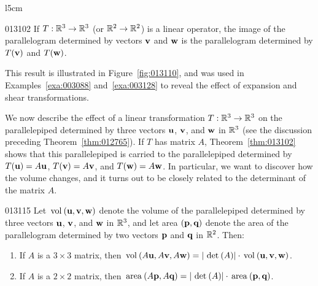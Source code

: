 \begin{wrapfigure}[11]{l}{5cm} 
\vspace*{-2em}
\centering

\caption{\label{fig:013110}}
\end{wrapfigure}

\hspace{0em}\hfill\begin{theorem}{}{013102}
If $T : \mathbb{R}^3 \to \mathbb{R}^3$ (or $\mathbb{R}^2 \to \mathbb{R}^2$) is a linear operator, the image of the parallelogram determined by vectors $\textbf{v}$ and $\textbf{w}$ is the parallelogram determined by $T(\textbf{v})$ and $T(\textbf{w})$.
\end{theorem}

\noindent This result is illustrated in Figure~\ref{fig:013110}, and was used in Examples~\ref{exa:003088} and~\ref{exa:003128} to reveal the effect of expansion and shear transformations.

We now describe the effect of a linear transformation $T: \mathbb{R}^3 \to \mathbb{R}^3$ on the parallelepiped determined by three vectors $\textbf{u}$, $\textbf{v}$, and $\textbf{w}$ in $\mathbb{R}^3$ (see the discussion preceding Theorem~\ref{thm:012765}). If $T$ has matrix $A$, Theorem~\ref{thm:013102} shows that this parallelepiped is carried to the parallelepiped determined by $T(\textbf{u}) = A\textbf{u}$, $T(\textbf{v}) = A\textbf{v}$, and $T(\textbf{w}) = A\textbf{w}$. In particular, we want to discover how the volume changes, and it turns out to be closely related to the determinant of the matrix $A$.

\begin{theorem}{}{013115}
Let $\thinspace\operatorname{vol\medspace}(\textbf{u}, \textbf{v}, \textbf{w})$ denote the volume of the parallelepiped determined by three vectors $\textbf{u}$, $\textbf{v}$, and $\textbf{w}$ in $\mathbb{R}^3$, and let area $(\textbf{p}, \textbf{q})$ denote the area of the parallelogram determined by two vectors $\textbf{p}$ and $\textbf{q}$ in $\mathbb{R}^2$. Then:

\begin{enumerate}
\item If $A$ is a $3 \times 3$ matrix, then $\thinspace\operatorname{vol\medspace}(A\textbf{u}, A\textbf{v}, A\textbf{w}) = |\thinspace\operatorname{det\medspace}(A)| \cdot \thinspace\operatorname{vol\medspace}(\textbf{u}, \textbf{v}, \textbf{w})$.

\item If $A$ is a $2 \times 2$ matrix, then $\thinspace\operatorname{area\medspace}(A\textbf{p}, A\textbf{q}) = |\thinspace\operatorname{det\medspace}(A)| \cdot \thinspace\operatorname{area\medspace}(\textbf{p}, \textbf{q})$.

\end{enumerate}
\end{theorem}

